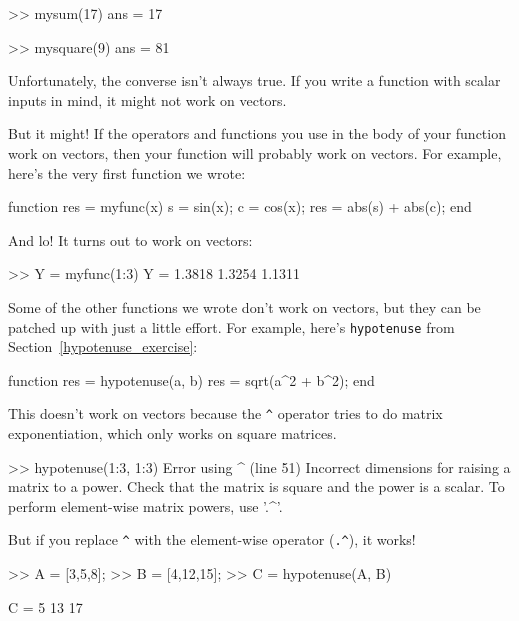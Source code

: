 
\begin{code}
>> mysum(17)
ans = 17

>> mysquare(9)
ans = 81
\end{code}

Unfortunately, the converse isn't always true.  If you write
a function with scalar inputs in mind, it might not work on vectors.

But it might!  If the operators and functions
you use in the body of your function work on vectors, then your
function will probably work on vectors.
For example, here's the very first function we wrote:

\begin{code}
function res = myfunc(x)
    s = sin(x);
    c = cos(x);
    res = abs(s) + abs(c);
end
\end{code}

And lo!  It turns out to work on vectors:

\begin{code}
>> Y = myfunc(1:3)
Y = 1.3818    1.3254    1.1311
\end{code}

Some of the other functions we wrote don't work on vectors,
but they can be patched up with just a little effort.  For example,
here's \lstinline{hypotenuse} from Section~\ref{hypotenuse_exercise}:

\begin{code}
function res = hypotenuse(a, b)
    res = sqrt(a^2 + b^2);
end
\end{code}

This doesn't work on vectors because the \lstinline{^} operator
tries to do matrix exponentiation, which only works on
square matrices.


\begin{code}
>> hypotenuse(1:3, 1:3)
Error using  ^  (line 51)
Incorrect dimensions for raising a matrix to a power. 
Check that the matrix is square and the power is a scalar. 
To perform element-wise matrix powers, use '.^'.
\end{code}

But if you replace \lstinline{^} with the element-wise operator
(\lstinline{.^}), it works!


\begin{code}
>> A = [3,5,8];
>> B = [4,12,15];
>> C = hypotenuse(A, B)

C = 5    13    17
\end{code}

